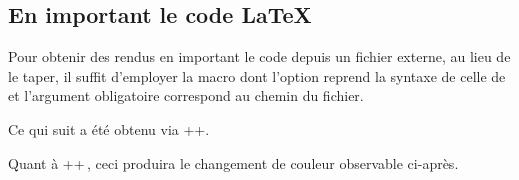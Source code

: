 \documentclass[10pt, a4paper]{tutodoc}
\begin{document}
\subsection{En important le code \LaTeX}

Pour obtenir des rendus en important le code depuis un fichier externe, au lieu de le taper, il suffit d'employer la macro  dont l'option reprend la syntaxe de celle de  et l'argument obligatoire correspond au chemin du fichier.


\begin{tdocexa}
    Ce qui suit a été obtenu via \tdocinlatex++.

    \medskip


    \medskip

    Quant à \tdocinlatex++\,, ceci produira le changement de couleur observable ci-après.

    \medskip

\end{tdocexa}
\end{document}
